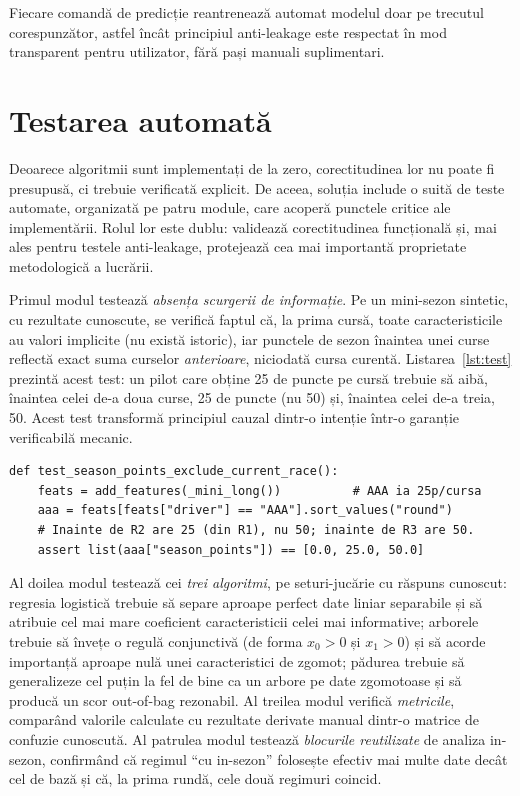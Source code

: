 \documentclass[12pt,a4paper]{report}
\begin{document}
Fiecare comandă de predicție reantrenează automat modelul doar pe trecutul corespunzător, astfel
încât principiul anti-leakage este respectat în mod transparent pentru utilizator, fără pași
manuali suplimentari.

\section{Testarea automată}
\label{sec:testare}

Deoarece algoritmii sunt implementați de la zero, corectitudinea lor nu poate fi presupusă, ci
trebuie verificată explicit. De aceea, soluția include o suită de teste automate, organizată pe
patru module, care acoperă punctele critice ale implementării. Rolul lor este dublu: validează
corectitudinea funcțională și, mai ales pentru testele anti-leakage, protejează cea mai importantă
proprietate metodologică a lucrării.

Primul modul testează \emph{absența scurgerii de informație}. Pe un mini-sezon sintetic, cu
rezultate cunoscute, se verifică faptul că, la prima cursă, toate caracteristicile au valori
implicite (nu există istoric), iar punctele de sezon înaintea unei curse reflectă exact suma
curselor \emph{anterioare}, niciodată cursa curentă. Listarea~\ref{lst:test} prezintă acest test:
un pilot care obține 25 de puncte pe cursă trebuie să aibă, înaintea celei de-a doua curse, 25 de
puncte (nu 50) și, înaintea celei de-a treia, 50. Acest test transformă principiul cauzal dintr-o
intenție într-o garanție verificabilă mecanic.

\begin{lstlisting}[caption={Test anti-leakage: punctele de sezon exclud cursa curenta.}, label={lst:test}]
def test_season_points_exclude_current_race():
    feats = add_features(_mini_long())          # AAA ia 25p/cursa
    aaa = feats[feats["driver"] == "AAA"].sort_values("round")
    # Inainte de R2 are 25 (din R1), nu 50; inainte de R3 are 50.
    assert list(aaa["season_points"]) == [0.0, 25.0, 50.0]
\end{lstlisting}

Al doilea modul testează cei \emph{trei algoritmi}, pe seturi-jucărie cu răspuns cunoscut: regresia
logistică trebuie să separe aproape perfect date liniar separabile și să atribuie cel mai mare
coeficient caracteristicii celei mai informative; arborele trebuie să învețe o regulă conjunctivă
(de forma $x_0 > 0$ și $x_1 > 0$) și să acorde importanță aproape nulă unei caracteristici de
zgomot; pădurea trebuie să generalizeze cel puțin la fel de bine ca un arbore pe date zgomotoase și
să producă un scor out-of-bag rezonabil. Al treilea modul verifică \emph{metricile}, comparând
valorile calculate cu rezultate derivate manual dintr-o matrice de confuzie cunoscută. Al patrulea
modul testează \emph{blocurile reutilizate} de analiza in-sezon, confirmând că regimul ``cu
in-sezon'' folosește efectiv mai multe date decât cel de bază și că, la prima rundă, cele două
regimuri coincid.
\end{document}
